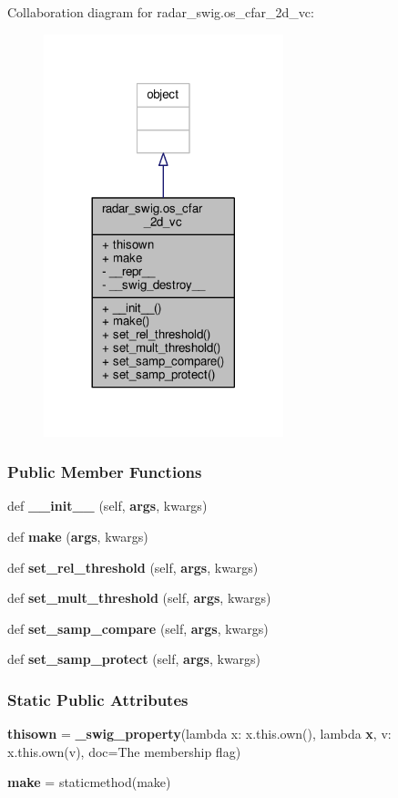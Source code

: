 Collaboration diagram for radar\+\_\+swig.\+os\+\_\+cfar\+\_\+2d\+\_\+vc\+:
\nopagebreak
\begin{figure}[H]
\begin{center}
\leavevmode
\includegraphics[width=197pt]{d7/db3/classradar__swig_1_1os__cfar__2d__vc__coll__graph}
\end{center}
\end{figure}
\subsubsection*{Public Member Functions}
\begin{DoxyCompactItemize}
\item 
def {\bf \+\_\+\+\_\+init\+\_\+\+\_\+} (self, {\bf args}, kwargs)
\item 
def {\bf make} ({\bf args}, kwargs)
\item 
def {\bf set\+\_\+rel\+\_\+threshold} (self, {\bf args}, kwargs)
\item 
def {\bf set\+\_\+mult\+\_\+threshold} (self, {\bf args}, kwargs)
\item 
def {\bf set\+\_\+samp\+\_\+compare} (self, {\bf args}, kwargs)
\item 
def {\bf set\+\_\+samp\+\_\+protect} (self, {\bf args}, kwargs)
\end{DoxyCompactItemize}
\subsubsection*{Static Public Attributes}
\begin{DoxyCompactItemize}
\item 
{\bf thisown} = {\bf \+\_\+swig\+\_\+property}(lambda x\+: x.\+this.\+own(), lambda {\bf x}, v\+: x.\+this.\+own(v), doc=\textquotesingle{}The membership flag\textquotesingle{})
\item 
{\bf make} = staticmethod(make)
\end{DoxyCompactItemize}
